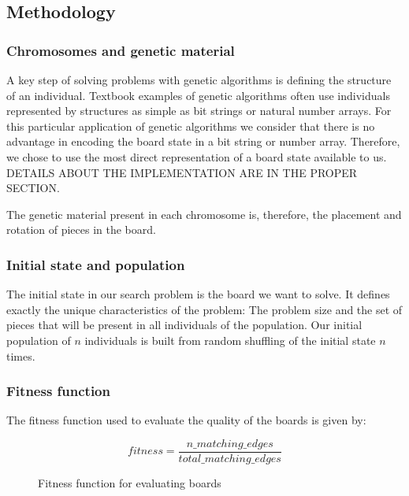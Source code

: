 \documentclass{llncs}
\begin{document}
\subsection{Methodology}\label{sec:methodology}

\subsubsection{Chromosomes and genetic material}
A key step of solving problems with genetic algorithms is defining the structure of an individual. Textbook examples of genetic algorithms often use individuals represented by structures as simple as bit strings or natural number arrays. For this particular application of genetic algorithms we consider that there is no advantage in encoding the board state in a bit string or number array. Therefore, we chose to use the most direct representation of a board state available to us. DETAILS ABOUT THE IMPLEMENTATION ARE IN THE PROPER SECTION.

The genetic material present in each chromosome is, therefore, the placement and rotation of pieces in the board.



\subsubsection{Initial state and population}
The initial state in our search problem is the board we want to solve. It defines exactly the unique characteristics of the problem: The problem size and the set of pieces that will be present in all individuals of the population.
Our initial population of $n$ individuals is built from random shuffling of the initial state $n$ times.




\subsubsection{Fitness function}\label{sec:fitness-function}

The fitness function used to evaluate the quality of the boards is given by:

\begin{figure}[h]
	\begin{equation}
		fitness = \frac{n\_matching\_edges}{total\_matching\_edges}
	\end{equation}
	\caption{Fitness function for evaluating boards}
	\label{fig:eq:fitness_function}
\end{figure}
\end{document}
